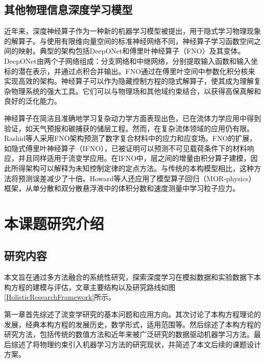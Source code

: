 \subsection{其他物理信息深度学习模型}
近年来，深度神经算子作为一种新的机器学习模型被提出，用于隐式学习物理现象的解算子\cite{luLearningNonlinearOperators2021}。与使用有限维向量空间的标准神经网络不同，神经算子学习函数空间之间的映射。典型的架构包括DeepONet和傅里叶神经算子（FNO）及其变体。DeepONet由两个子网络组成：分支网络和中继网络，分别提取输入函数和输入坐标的潜在表示，并通过点积合并输出。FNO通过在傅里叶空间中参数化积分核来实现高效的架构。神经算子可以作为隐藏控制方程的隐式解算子，使其成为理解复杂物理系统的强大工具。它们可以与物理场和其他域约束结合，以获得高保真解和良好的泛化能力。

神经算子在简洁且准确地学习复杂动力学方面表现出色，已在流体力学应用中得到验证，如天气预报和碳捕获的储层工程。然而，在复杂流体领域的应用仍有限。Rashid等人采用FNO架构预测了数字复合材料中的应力和应变场\cite{rashid2022learning}。FNO的扩展，如隐式傅里叶神经算子（IFNO），已被证明可以预测不可见载荷条件下的材料响应，并且同样适用于流变学应用\cite{you2022learning}。在IFNO中，层之间的增量由积分算子建模，因此所得架构可以解释为未知控制定律的定点方法。与传统的本构模型相比，这种方法将预测误差减少了十倍。Howard等人还应用了模型算子回归（MOR-physics）框架，从单分散和双分散悬浮液中的体积分数和速度测量中学习粒子应力\cite{howardMachineLearningMethods2023}。


\section{本课题研究介绍}
\subsection{研究内容}
本文旨在通过多方法融合的系统性研究，探索深度学习在模拟数据和实验数据下本构方程的建模与评估，文章主要结构以及研究路线如图\ref{HolisticResearchFramework}所示。

第一章首先综述了流变学研究的基本问题和应用方向。其次讨论了本构方程理论的发展，经典本构方程的发展历史，数学形式，适用范围等。然后综述了本构方程的研究方法，包括传统的数值方法和近年来被广泛研究的数据驱动机器学习方法。最后综述了将物理约束引入机器学习方法的研究现状，并简述了本文后续的课题设计方案。


